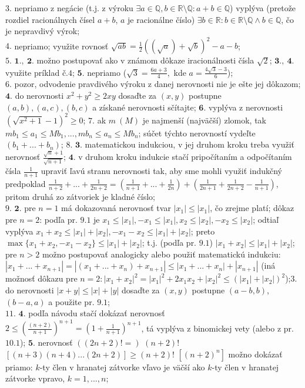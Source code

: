 $\boxed{3.}$
nepriamo z negácie (t.j. z výroku $\exists a\in\mathbb{Q},b\in\mathbb{R}\setminus \mathbb{Q}:a+b\in\mathbb{Q}$) vyplýva (pretože rozdiel racionálnych čísel $a+b$, $a$ je racionálne číslo) $\exists b\in \mathbb{R}:b\in \mathbb{R}\setminus \mathbb{Q}\wedge b\in \mathbb{Q}$, čo je nepravdivý výrok;\\
$\boxed{4.}$
nepriamo; využite rovnosť $\sqrt{ab}=\frac{1}{2}((\sqrt{a})+\sqrt{b})^2-a-b$;\\
$\boxed{5.}$
$\boldsymbol{1.},\ \boldsymbol{2.}$ možno postupovať ako v známom dôkaze iracionálnosti čísla $\sqrt{2}$; $\boldsymbol{3.},\ \boldsymbol{4.}$ využite príklad č.$4$; $\boldsymbol{5.}$ nepriamo ($\sqrt{3}=\frac{6a+3}{4},$ kde $a=\frac{4\sqrt{3}-3}{6}$);\\
$\boxed{6.}$
pozor, odvodenie pravdivého výroku z danej nerovnosti nie je ešte jej dôkazom;
$\boldsymbol{4.}$ do nerovnosti $x^2+y^2\geq 2xy$ dosaďte za $(x,y)$ postupne $(a,b),(a,c),(b,c)$ a získané nerovnosti sčítajte;
$\boldsymbol{6.}$ vyplýva z nerovnosti $(\sqrt{x^2+1}-1)^2 \geq 0$;
$\boxed{7.}$ 
ak $m\ (M)$ je najmenší (najväčší) zlomok, tak $mb_1\leq a_1\leq Mb_1,...,mb_n\leq a_n\leq Mb_n$; súčet týchto nerovností vydeľte $(b_1+...+b_n)$;
$\boxed{8.}$
$\boldsymbol{3.}$ matematickou indukciou, v jej druhom kroku treba využiť nerovnosť $\frac{\sqrt{n}+1}{\sqrt{n+1}}$;
$\boldsymbol{4.}$ v druhom kroku indukcie stačí pripočítaním a odpočítaním čísla $\frac{1}{n+1}$ upraviť ľavú stranu nerovnosti tak, aby sme mohli využiť indukčný predpoklad $\frac{1}{n+2}+...+\frac{1}{2n+2}=(\frac{1}{n+1}+...+\frac{1}{2n})+(\frac{1}{2n+1}+\frac{1}{2n+2}-\frac{1}{n+1})$, pritom druhá zo zátvoriek je kladné číslo;\\
$\boxed{9.}$
$\boldsymbol{2.}$ pre $n=1$ má dokazovaná nerovnosť tvar $|x_1|\leq |x_1|$, čo zrejme platí; dôkaz pre $n=2$: podľa pr. $9.1$ je $x_1\leq |x_1|,-x_1\leq |x_1|,x_2\leq |x_2|,-x_2\leq |x_2|$; odtiaľ vyplýva $x_1+x_2 \leq |x_1|+|x_2|,-x_1-x_2\leq |x_1|+|x_2|$; preto $\max \{x_1+x_2,-x_1-x_2\}\leq |x_1|+|x_2|$; t.j. (podľa pr. $9.1$) $|x_1+x_2|\leq |x_1|+|x_2|$; pre $n>2$ možno postupovať analogicky alebo použiť matematickú indukciu: $|x_1+...+x_{n+1}|=|(x_1+...+x_n)+x_{n+1}|\leq |x_1+...+x_n|+|x_{n+1}|$ (iná možnosť dôkazu pre $n=2:|x_1+x_2|^2=|x_1|^2+2x_1x_2+|x_2|^2\leq (|x_1|+|x_2|)^2$);$3.$ do nerovnosti $|x+y|\leq |x|+|y|$ dosaďte za $(x,y)$ postupne $(a-b,b)$, $(b-a,a)$ a použite pr. $9.1$;\\
$\boxed{11.}$
$\boldsymbol{4.}$ podľa návodu stačí dokázať nerovnosť $2\leq (\frac{(n+2)}{n+1})^{n+1}=(1+\frac{1}{n+1})^{n+1}$, tá vyplýva z binomickej vety (alebo z pr. $10.1$); $\boldsymbol{5.}$ nerovnosť $((2n+2)!=)$ $(n+2)!$ $[(n+3)(n+4)...(2n+2)]\geq (n+2)!$ $[(n+2)^n]$ možno dokázať priamo: $k$-ty člen v hranatej zátvorke vľavo je väčší ako $k$-ty člen v hranatej zátvorke vpravo, $k=1,...,n$;
